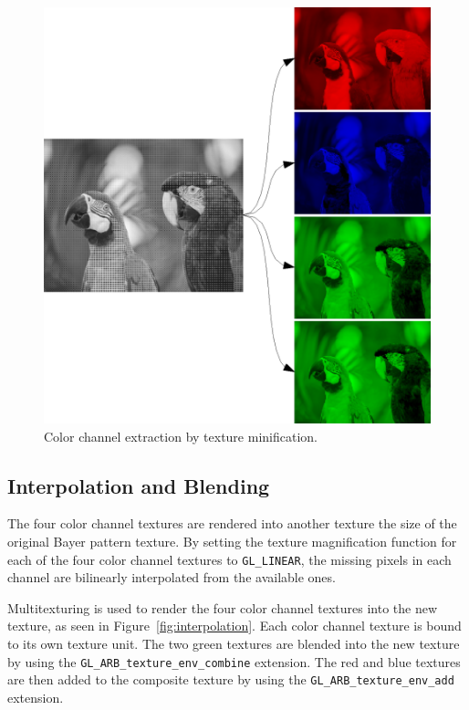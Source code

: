 \documentclass[11pt,letterpaper]{article}
\begin{document}
\begin{figure}
\centering
\includegraphics{channel_extraction}
\caption{Color channel extraction by texture minification.}
\label{fig:channel_extraction}
\end{figure}

\subsection{Interpolation and Blending}

The four color channel textures are rendered into another texture the
size of the original Bayer pattern texture.  By setting the texture
magnification function for each of the four color channel textures to
\texttt{GL\_LINEAR}, the missing pixels in each channel are bilinearly
interpolated from the available ones.

Multitexturing is used to render the four color channel textures into
the new texture, as seen in Figure~\ref{fig:interpolation}.  Each
color channel texture is bound to its own texture unit.  The two green
textures are blended into the new texture by using the
\texttt{GL\_ARB\_texture\_env\_combine} extension.  The red and blue
textures are then added to the composite texture by using the
\texttt{GL\_ARB\_texture\_env\_add} extension.
\end{document}

